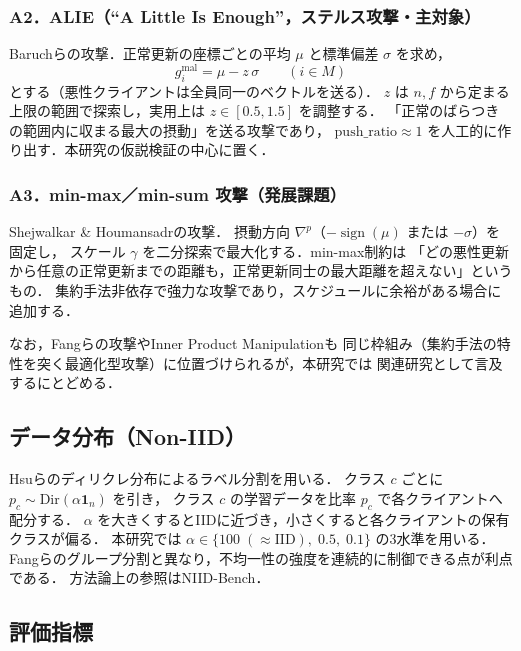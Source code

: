\documentclass[a4j, dvipdfmx]{jsarticle}  %
\begin{document}
\subsubsection*{A2．ALIE（``A Little Is Enough''，ステルス攻撃・主対象）}
Baruchら\cite{baruch2019little}の攻撃．正常更新の座標ごとの平均 $\mu$ と標準偏差 $\sigma$ を求め，
\begin{equation}
g_i^{\text{mal}} = \mu - z\,\sigma \qquad (i \in M)
\end{equation}
とする（悪性クライアントは全員同一のベクトルを送る）．
$z$ は $n, f$ から定まる上限の範囲で探索し，実用上は $z \in [0.5, 1.5]$ を調整する．
「正常のばらつきの範囲内に収まる最大の摂動」を送る攻撃であり，
$\mathrm{push\_ratio} \approx 1$ を人工的に作り出す．本研究の仮説検証の中心に置く．

\subsubsection*{A3．min-max／min-sum 攻撃（発展課題）}
Shejwalkar \& Houmansadr\cite{shejwalkar2021manipulating}の攻撃．
摂動方向 $\nabla^{p}$（$-\operatorname{sign}(\mu)$ または $-\sigma$）を固定し，
スケール $\gamma$ を二分探索で最大化する．min-max制約は
「どの悪性更新から任意の正常更新までの距離も，正常更新同士の最大距離を超えない」というもの．
集約手法非依存で強力な攻撃であり，スケジュールに余裕がある場合に追加する．

\medskip
\noindent
なお，Fangら\cite{fang2020local}の攻撃やInner Product Manipulation\cite{xie2019fall}も
同じ枠組み（集約手法の特性を突く最適化型攻撃）に位置づけられるが，本研究では
関連研究として言及するにとどめる．

\subsection{データ分布（Non-IID）}

Hsuら\cite{hsu2019measuring}のディリクレ分布によるラベル分割を用いる．
クラス $c$ ごとに $p_c \sim \mathrm{Dir}(\alpha \mathbf{1}_n)$ を引き，
クラス $c$ の学習データを比率 $p_c$ で各クライアントへ配分する．
$\alpha$ を大きくするとIIDに近づき，小さくすると各クライアントの保有クラスが偏る．
本研究では $\alpha \in \{100\;(\approx\text{IID}),\; 0.5,\; 0.1\}$ の3水準を用いる．
Fangらのグループ分割と異なり，不均一性の強度を連続的に制御できる点が利点である．
方法論上の参照はNIID-Bench\cite{li2022federated}．

\subsection{評価指標}
\label{sec:metrics}
\end{document}
